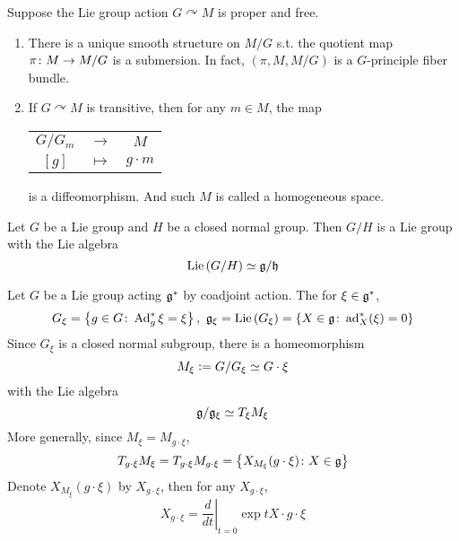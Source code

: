\documentclass[a4paper,12pt]{article}
\begin{document}
	\begin{thm}
		Suppose the Lie group action $G \curvearrowright M$ is proper and free.
		\begin{enumerate}
			\item There is a unique smooth structure on $M/G$ s.t. the quotient map $\pi \colon M \rightarrow M/ G$ is a submersion. In fact, $(\pi, M, M/G)$ is a $G$-principle fiber bundle.
			\item If $G\curvearrowright M$ is transitive, then for any $m \in M$, the map
			\begin{center}
				\begin{tabular}{c c c}
					$G / G_m$ & $\longrightarrow$ & $M$ \\
					$[g]$ & $\longmapsto$ & $g \cdot m$
				\end{tabular}
			\end{center}
			is a diffeomorphism. And such $M$ is called a homogeneous space.
		\end{enumerate}
	\end{thm}
	\begin{cor}
		Let $G$ be a Lie group and $H$ be a closed normal group. Then $G/H$ is a Lie group with the Lie algebra
		\begin{equation*}
			\operatorname{Lie}\left(G/H\right) \simeq \mathfrak{g} / \mathfrak{h}
		\end{equation*}
	\end{cor}
	\begin{exam}
		Let $G$ be a Lie group acting $\mathfrak{g}^*$ by coadjoint action. The for $\xi \in \mathfrak{g}^*$,
		\begin{equation*}
			G_{\xi} = \left\{g \in G \colon \operatorname{Ad}^*_{g}\xi = \xi\right\},~\mathfrak{g}_{\xi} = \operatorname{Lie}\left(G_{\xi}\right) = \left\{X \in \mathfrak{g} \colon \operatorname{ad}^*_X(\xi) = 0\right\}
		\end{equation*}
		Since $G_{\xi}$ is a closed normal subgroup, there is a homeomorphism
		\begin{equation*}
			M_{\xi} \vcentcolon= G / G_{\xi} \simeq G \cdot \xi
		\end{equation*}
		with the Lie algebra
		\begin{equation*}
			\mathfrak{g} / \mathfrak{g}_{\xi} \simeq T_{\xi}M_{\xi}
		\end{equation*}
		More generally, since $M_{\xi} = M_{g\cdot \xi}$, 
		\begin{equation*}
			T_{g\cdot \xi}M_{\xi} = T_{g\cdot \xi}M_{g\cdot \xi} = \left\{X_{M_{\xi}}(g\cdot \xi) \colon X \in \mathfrak{g}\right\}
		\end{equation*}
		Denote $X_{M_{\xi}}(g\cdot \xi)$ by $X_{g\cdot \xi}$, then for any $X_{g\cdot \xi}$,
		\begin{equation*}
			X_{g\cdot \xi} = \left.\frac{d}{dt}\right\lvert_{t=0}\exp{tX}\cdot g \cdot \xi
		\end{equation*}
	\end{exam}
\end{document}
